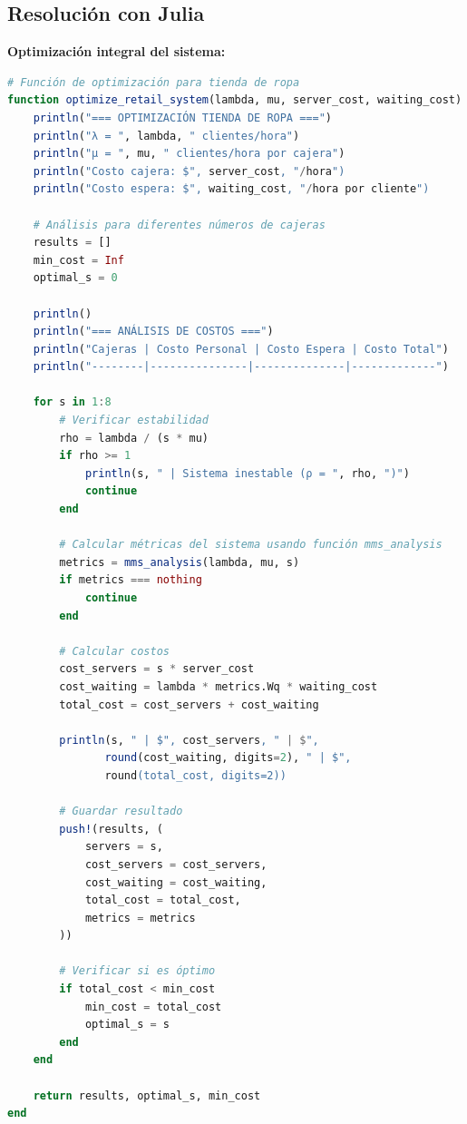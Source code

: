 \documentclass[12pt, a4paper, oneside]{book}
\theoremstyle{definition}
\begin{document}
\begin{center}
\begin{center}
\subsection{Resolución con Julia}

\textbf{Optimización integral del sistema:}

\begin{lstlisting}[language=Julia]
# Función de optimización para tienda de ropa
function optimize_retail_system(lambda, mu, server_cost, waiting_cost)
    println("=== OPTIMIZACIÓN TIENDA DE ROPA ===")
    println("λ = ", lambda, " clientes/hora")
    println("μ = ", mu, " clientes/hora por cajera")
    println("Costo cajera: $", server_cost, "/hora")
    println("Costo espera: $", waiting_cost, "/hora por cliente")
    
    # Análisis para diferentes números de cajeras
    results = []
    min_cost = Inf
    optimal_s = 0
    
    println()
    println("=== ANÁLISIS DE COSTOS ===")
    println("Cajeras | Costo Personal | Costo Espera | Costo Total")
    println("--------|---------------|--------------|-------------")
    
    for s in 1:8
        # Verificar estabilidad
        rho = lambda / (s * mu)
        if rho >= 1
            println(s, " | Sistema inestable (ρ = ", rho, ")")
            continue
        end
        
        # Calcular métricas del sistema usando función mms_analysis
        metrics = mms_analysis(lambda, mu, s)
        if metrics === nothing
            continue
        end
        
        # Calcular costos
        cost_servers = s * server_cost
        cost_waiting = lambda * metrics.Wq * waiting_cost
        total_cost = cost_servers + cost_waiting
        
        println(s, " | $", cost_servers, " | $", 
               round(cost_waiting, digits=2), " | $", 
               round(total_cost, digits=2))
        
        # Guardar resultado
        push!(results, (
            servers = s,
            cost_servers = cost_servers,
            cost_waiting = cost_waiting,
            total_cost = total_cost,
            metrics = metrics
        ))
        
        # Verificar si es óptimo
        if total_cost < min_cost
            min_cost = total_cost
            optimal_s = s
        end
    end
    
    return results, optimal_s, min_cost
end


\end{lstlisting}
\end{center}
\end{center}
\end{document}
